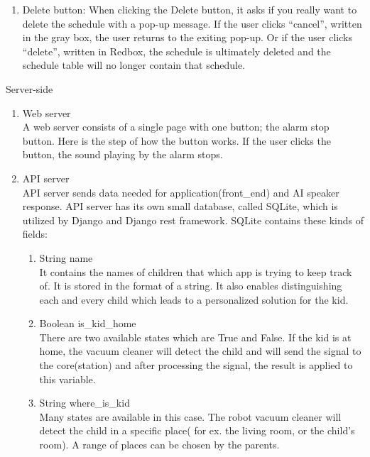 \documentclass[conference]{IEEEtran}
\begin{document}
\begin{enumerate}[label=\arabic*.]
\begin{enumerate}[label=\alph*.]
\begin{enumerate}[label=\roman*.]
            \item {\large{Delete button: When clicking the Delete button, it asks if you really want to delete the schedule with a pop-up message. If the user clicks “cancel”, written in the gray box, the user returns to the exiting pop-up. Or if the user clicks “delete”, written in Redbox, the schedule is ultimately deleted and the schedule table will no longer contain that schedule. }} \\
        \end{enumerate}
    \end{enumerate}
\begin{center}\large{Server-side}\end{center}
\begin{enumerate}[label=\arabic*.]
    \item {\large{Web server}} \\
    A web server consists of a single page with one button; the alarm stop button. Here is the step of how the button works. If the user clicks the button, the sound playing by the alarm stops. \\
    \item {\large{API server}} \\
    API server sends data needed for application(front\_end) and AI speaker response. API server has its own small database, called SQLite, which is utilized by Django and Django rest framework. SQLite contains these kinds of fields: \\
    \begin{enumerate}[label=\alph*.]
        \item {\large{String name}} \\
        It contains the names of children that which app is trying to keep track of. It is stored in the format of a string. It also enables distinguishing each and every child which leads to a personalized solution for the kid. \\
        \item {\large{Boolean is\_kid\_home}} \\
        There are two available states which are True and False. If the kid is at home, the vacuum cleaner will detect the child and will send the signal to the core(station) and after processing the signal, the result is applied to this variable. \\
        \item {\large{String where\_is\_kid}} \\
        Many states are available in this case. The robot vacuum cleaner will detect the child in a specific place( for ex. the living room, or the child's room). A range of places can be chosen by the parents. \\

\end{enumerate}
\end{enumerate}
\end{enumerate}
\end{document}
